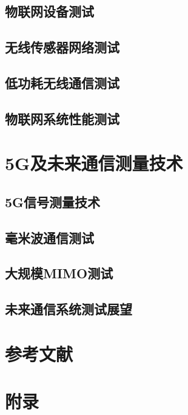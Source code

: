 \documentclass[12pt,UTF8]{ctexbook}
\begin{document}
\section{物联网设备测试}
\section{无线传感器网络测试}
\section{低功耗无线通信测试}
\section{物联网系统性能测试}

\chapter{5G及未来通信测量技术}
\section{5G信号测量技术}
\section{毫米波通信测试}
\section{大规模MIMO测试}
\section{未来通信系统测试展望}

\backmatter

\chapter{参考文献}

\chapter{附录}
\end{document}
